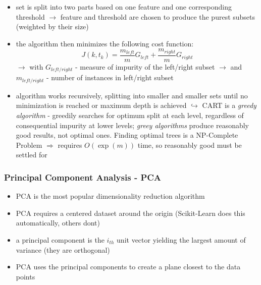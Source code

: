 \documentclass[12pt,a4paper]{article}
\begin{document}
\begin{itemize}
   \item set is split into two parts based on one feature and one corresponding threshold
   \newline \indent $\longrightarrow$ feature and threshold are chosen to produce the purest subsets (weighted by their size)
   \item the algorithm then minimizes the following cost function:
   \begin{equation}
     J(k, t_k) = \frac{m_{left}}{m}G_{left} + \frac{m_{right}}{m}G_{right}
   \end{equation}
   \newline \indent $\longrightarrow$ with $G_{left/right}$ - measure of impurity of the left/right subset
   \newline \indent $\longrightarrow$ and $m_{left/right}$ - number of instances in left/right subset
   \item algorithm works recursively, splitting into smaller and smaller sets until no minimization is reached or maximum depth is achieved
   \newline \indent $\hookrightarrow$ CART is a \textit{greedy algorithm} - greedily searches for optimum split at each level, regardless of consequential impurity at lower levels; \textit{greey algorithms} produce reasonably good results, not optimal ones. Finding optimal trees is a NP-Complete Problem $\Longrightarrow$ requires $O(\exp(m))$ time, so reasonably good must be settled for
 \end{itemize} 

\subsubsection{Principal Component Analysis - PCA} %
\label{ssub:principal_component_analysis_pca}

\begin{itemize}
  \item PCA is the most popular dimensionality reduction algorithm
  \item PCA requires a centered dataset around the origin (Scikit-Learn does this automatically, others dont)
  \item a principal component is the $i_{th}$ unit vector yielding the largest amount of variance (they are orthogonal)
  \item PCA uses the principal components to create a plane closest to the data points
\end{itemize}
\end{document}
